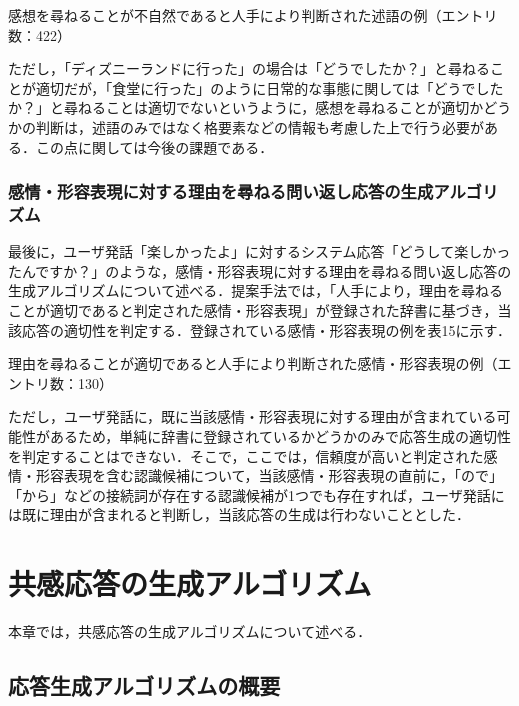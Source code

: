 \documentclass[japanese]{jnlp_1.4}
\begin{document}
\begin{table}[b]
\caption{感想を尋ねることが不自然であると人手により判断された述語の例（エントリ数：422）}
\label{table:14}

\end{table}

ただし，「ディズニーランドに行った」の場合は「どうでしたか？」と尋ねることが適切だが，「食堂に行った」のように日常的な事態に関しては「どうでしたか？」と尋ねることは適切でないというように，感想を尋ねることが適切かどうかの判断は，述語のみではなく格要素などの情報も考慮した上で行う必要がある．この点に関しては今後の課題である．


\subsubsection{感情・形容表現に対する理由を尋ねる問い返し応答の生成アルゴリズム}

最後に，ユーザ発話「楽しかったよ」に対するシステム応答「どうして楽しかったんですか？」のような，感情・形容表現に対する理由を尋ねる問い返し応答の生成アルゴリズムについて述べる．提案手法では，「人手により，理由を尋ねることが適切であると判定された感情・形容表現」が登録された辞書に基づき，当該応答の適切性を判定する．登録されている感情・形容表現の例を表15に示す．

\begin{table}[b]
\caption{理由を尋ねることが適切であると人手により判断された感情・形容表現の例（エントリ数：130）}
\label{table:15}

\end{table}

ただし，ユーザ発話に，既に当該感情・形容表現に対する理由が含まれている可能性があるため，単純に辞書に登録されているかどうかのみで応答生成の適切性を判定することはできない．そこで，ここでは，信頼度が高いと判定された感情・形容表現を含む認識候補について，当該感情・形容表現の直前に，「ので」「から」などの接続詞が存在する認識候補が1つでも存在すれば，ユーザ発話には既に理由が含まれると判断し，当該応答の生成は行わないこととした．


\section{共感応答の生成アルゴリズム}

本章では，共感応答の生成アルゴリズムについて述べる．


\subsection{応答生成アルゴリズムの概要}
\end{document}
